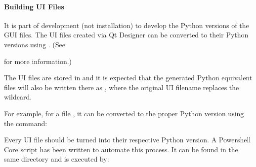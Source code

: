 \documentclass[letterpaper,11pt,english]{sphinxmanual}
\begin{document}
\paragraph{Building UI Files}
\label{\detokenize{technical/architecture/graphical_user_interface:building-ui-files}}\label{\detokenize{technical/architecture/graphical_user_interface:technical-architecture-graphical-user-interface-building-ui-files}}
\sphinxAtStartPar
It is part of development (not installation) to develop the Python versions of
the GUI files. The UI files created via Qt Designer can be converted to their
Python versions using . (See
%
\begin{footnote}[60]\sphinxAtStartFootnote
{}
%
\end{footnote}
for more information.)

\sphinxAtStartPar
The UI files are stored in 
and it is expected that the generated Python equivalent files will also be
written there as , where the original UI filename replaces
the wildcard.

\sphinxAtStartPar
For example, for a file , it can be converted to the proper
Python version using the command:

\begin{sphinxVerbatim}[commandchars=\\\{\}]
   
\end{sphinxVerbatim}

\sphinxAtStartPar
Every UI file should be turned into their respective Python version. A
Powershell Core script has been written to automate this process. It can be
found in the same directory and is executed by:

\begin{sphinxVerbatim}[commandchars=\\\{\}]
 
\end{sphinxVerbatim}
\end{document}
